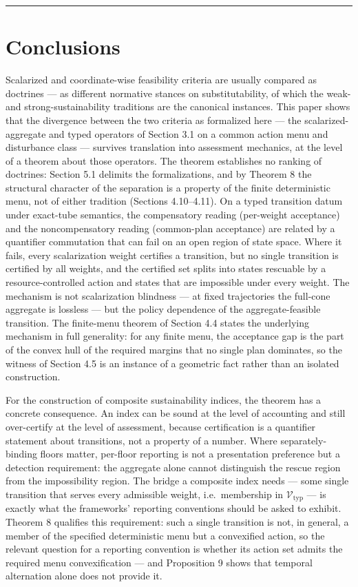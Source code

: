 \documentclass[review,11pt]{elsarticle}
\begin{document}
\begin{center}\rule{0.5\linewidth}{0.5pt}\end{center}

\section{Conclusions}\label{conclusions}

Scalarized and coordinate-wise feasibility criteria are usually compared
as doctrines --- as different normative stances on substitutability, of
which the weak- and strong-sustainability traditions are the canonical
instances. This paper shows that the divergence between the two criteria
as formalized here --- the scalarized-aggregate and typed
operators of Section 3.1 on a common action menu and disturbance class
--- survives translation into assessment mechanics, at the level of a
theorem about those operators. The theorem establishes no ranking of doctrines: Section 5.1 delimits the formalizations, and by Theorem 8 the structural character of the separation is a property of the finite deterministic menu, not of either tradition (Sections 4.10--4.11). On a typed transition datum under exact-tube semantics, the
compensatory reading (per-weight acceptance) and the noncompensatory
reading (common-plan acceptance) are related by a quantifier commutation
that can fail on an open region of state space. Where it fails, every
scalarization weight certifies a transition, but no single transition is
certified by all weights, and the certified set splits into states
rescuable by a resource-controlled action and states that are impossible
under every weight. The mechanism is not scalarization blindness --- at
fixed trajectories the full-cone aggregate is lossless --- but the
policy dependence of the aggregate-feasible transition. The
finite-menu theorem of Section 4.4 states the underlying mechanism in
full generality: for any finite menu, the acceptance gap is the part of
the convex hull of the required margins that no single plan dominates,
so the witness of Section 4.5 is an instance of a geometric fact rather
than an isolated construction.

For the construction of composite sustainability indices, the theorem
has a concrete consequence. An index can be sound at the level of
accounting and still over-certify at the level of assessment, because
certification is a quantifier statement about transitions, not a
property of a number. Where separately-binding floors matter, per-floor
reporting is not a presentation preference but a detection requirement:
the aggregate alone cannot distinguish the rescue region from the
impossibility region. The bridge a composite index needs --- some single
transition that serves every admissible weight, i.e.~membership in
\(\mathcal{V}_{\mathrm{typ}}\) --- is exactly what the frameworks'
reporting conventions should be asked to exhibit. Theorem 8 qualifies this requirement: such a single transition is not, in general, a member of the specified deterministic menu but a convexified action, so the relevant question for a reporting convention is whether its action set admits the required menu convexification --- and Proposition 9 shows that temporal alternation alone does not provide it.
\end{document}
